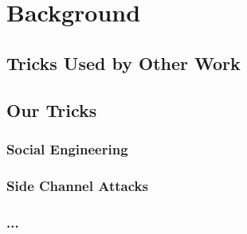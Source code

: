 \section{Background}
\label{SEC:background}

\subsection{Tricks Used by Other Work}

\subsection{Our Tricks}
\subsubsection{Social Engineering}
\subsubsection{Side Channel Attacks}
\subsubsection{...}

